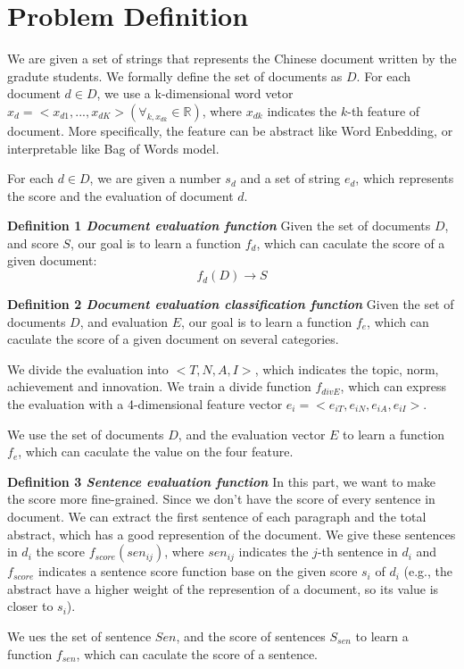 \documentclass[UTF8]{ctexart}
\numberwithin{equation}{section}
\begin{document}
\section{Problem Definition}
We are given a set of strings that represents the Chinese document written by the gradute students. We formally define the set of documents as $D$. For each document $d\in D$, we use a k-dimensional word vetor $x_{d}=<x_{d1},...,x_{dK}>(\forall_{k,x_{dk}} \in \mathbb{R})$, where $x_{dk}$ indicates the $k$-th feature of document. More specifically, the feature can be abstract like Word Enbedding, or interpretable like Bag of Words model.

For each $d\in D$, we are given a number $s_{d}$ and a set of string $e_{d}$, which represents the score and the evaluation of document $d$.

\noindent \textbf{Definition 1 \emph{Document evaluation function}} Given the set of documents $D$, and score $S$, our goal is to learn a function $f_{d}$, which can caculate the score of a given document:
\begin{equation}
f_{d}(D) \rightarrow  S
\end{equation}

\noindent \textbf{Definition 2 \emph{Document evaluation classification function}} Given the set of documents $D$, and evaluation $E$, our goal is to learn a function $f_{e}$, which can caculate the score of a given document on several categories. 

We divide the evaluation into $<T,N,A,I>$, which indicates the topic, norm, achievement and innovation. We train a divide function $f_{divE}$, which can express the evaluation with a 4-dimensional feature vector $e_{i}=<e_{iT},e_{iN},e_{iA},e_{iI}>$.

We use the set of documents $D$, and the evaluation vector $E$ to learn a function $f_{e}$, which can caculate the value on the four feature.

\noindent \textbf{Definition 3 \emph{Sentence evaluation function}} In this part, we want to make the score more fine-grained. Since we don't have the score of every sentence in document. We can extract the first sentence of each paragraph and the total abstract, which has a good represention of the document. We give these sentences in $d_{i}$ the score $f_{score}(sen_{ij})$, where $sen_{ij}$ indicates the $j$-th sentence in $d_{i}$ and $f_{score}$ indicates a sentence score function base on the given score $s_{i}$ of $d_{i}$ (e.g., the abstract have a higher weight of the represention of a document, so its value is closer to $s_{i}$).

We ues the set of sentence $Sen$, and the score of sentences $S_{sen}$ to learn a function $f_{sen}$, which can caculate the score of a sentence.
\end{document}
